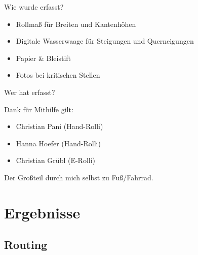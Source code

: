 \documentclass{beamer}
\begin{document}
\begin{frame}{Wie wurde erfasst?}
    \begin{itemize}
      \item Rollmaß für Breiten und Kantenhöhen
      \item Digitale Wasserwaage für Steigungen und Querneigungen
      \item Papier \& Bleistift
      \item Fotos bei kritischen Stellen
    \end{itemize}

\end{frame}

\begin{frame}{Wer hat erfasst?}

  Dank für Mithilfe gilt:
  \begin{itemize}
        \item Christian Pani (Hand-Rolli)
        \item Hanna Hoefer (Hand-Rolli)
        \item Christian Grübl (E-Rolli)
  \end{itemize}
            \vspace{1cm}

  \pause
  Der Großteil durch mich selbst zu Fuß/Fahrrad.

\end{frame}



\section{Ergebnisse}

\subsection{Routing}
\end{document}
